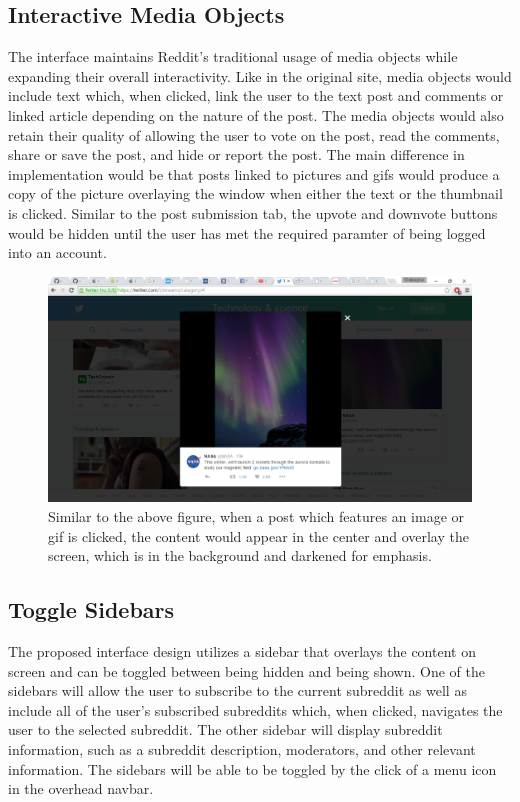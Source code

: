 \documentclass{article}
\begin{document}
\subsection{Interactive Media Objects} The interface maintains Reddit's traditional usage of media objects while expanding their overall interactivity. Like in the original site, media objects would include text which, when clicked, link the user to the text post and comments or linked article depending on the nature of the post. The media objects would also retain their quality of allowing the user to vote on the post, read the comments, share or save the post, and hide or report the post. The main difference in implementation would be that posts linked to pictures and gifs would produce a copy of the picture overlaying the window when either the text or the thumbnail is clicked. Similar to the post submission tab, the upvote and downvote buttons would be hidden until the user has met the required paramter of being logged into an account.

\begin{figure}[H]
\begin{center}
\includegraphics[width=1\textwidth]{media.png}
\caption{Similar to the above figure, when a post which features an image or gif is clicked, the content would appear in the center and overlay the screen, which is in the background and darkened for emphasis.}
\end{center}
\end{figure}

\subsection{Toggle Sidebars} The proposed interface design utilizes a sidebar that overlays the content on screen and can be toggled between being hidden and being shown. One of the sidebars will allow the user to subscribe to the current subreddit as well as include all of the user's subscribed subreddits which, when clicked, navigates the user to the selected subreddit. The other sidebar will display subreddit information, such as a subreddit description, moderators, and other relevant information. The sidebars will be able to be toggled by the click of a menu icon in the overhead navbar.
\end{document}
